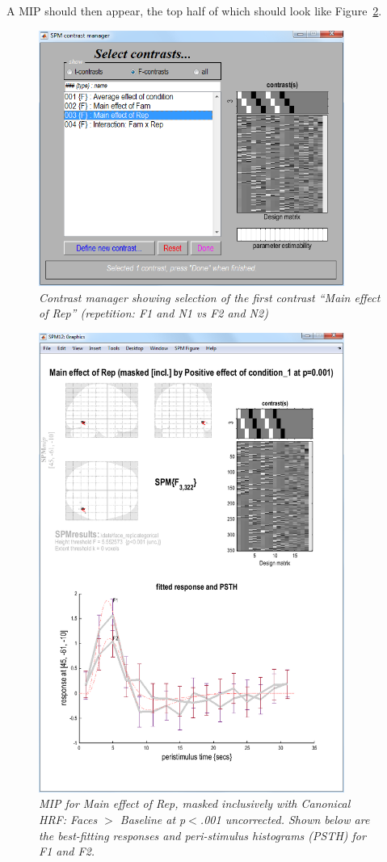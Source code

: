 A MIP should then appear, the top half of which should look like Figure~\ref{cat3_psth}.

\begin{figure}
\begin{center}
\includegraphics[width=100mm]{faces/cat3_contrast}
\caption{\em Contrast manager showing selection of the first contrast ``Main effect of Rep'' (repetition: F1 and N1 vs F2 and N2)\label{cat3_contrast} }
\end{center}
\end{figure}

\begin{figure}
\begin{center}
\includegraphics[width=100mm]{faces/cat3_psth}
\caption{\em MIP for Main effect of Rep, masked inclusively with Canonical HRF: Faces  $>$ Baseline at p$<$.001 uncorrected. Shown below are the best-fitting responses and peri-stimulus histograms (PSTH) for F1 and F2. \label{cat3_psth} } 
\end{center}
\end{figure}


